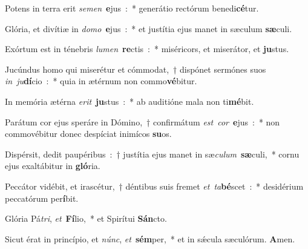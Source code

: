 ﻿\item Potens in terra erit \emph{se}\-\emph{men}\ \textbf{e}\-jus~:~* generátio rectórum benedi\textbf{cé}tur.
\item Glória, et divítiæ in \emph{do}\-\emph{mo}\ \textbf{e}\-jus~:~* et justítia ejus manet in sæculum \textbf{sæ}culi.
\item Exórtum est in ténebris \emph{lu}\-\emph{men}\ \textbf{re}\-ctis~:~* miséricors, et miserátor, et \textbf{ju}stus.
\item Jucúndus homo qui miserétur et cómmodat,~† dispónet sermónes suos \emph{in}\ \emph{ju}\-\textbf{dí}\-cio~:~* quia in ætérnum non commo\textbf{vé}bitur.
\item In memória ætérna \emph{e}\-\emph{rit}\ \textbf{ju}\-stus~:~* ab auditióne mala non ti\textbf{mé}bit.
\item Parátum cor ejus speráre in Dómino,~† confirmátum \emph{est}\ \emph{cor}\ \textbf{e}\-jus~:~* non commovébitur donec despíciat inimícos \textbf{su}os.
\item Dispérsit, dedit paupéribus~:~† justítia ejus manet in sæ\emph{cu}\-\emph{lum}\ \textbf{sæ}\-culi,~* cornu ejus exaltábitur in \textbf{gló}ria.
\item Peccátor vidébit, et irascétur,~† déntibus suis fremet \emph{et}\ \emph{ta}\-\textbf{bé}\-scet~:~* desidérium peccatórum per\textbf{í}bit.
\item Glória Pá\emph{tri}, \emph{et}\ \textbf{Fí}\-lio,~* et Spirítui \textbf{Sán}cto.
\item Sicut érat in princípio, et \emph{núnc}, \emph{et}\ \textbf{sém}\-per,~* et in sǽcula sæculórum. \textbf{A}men.